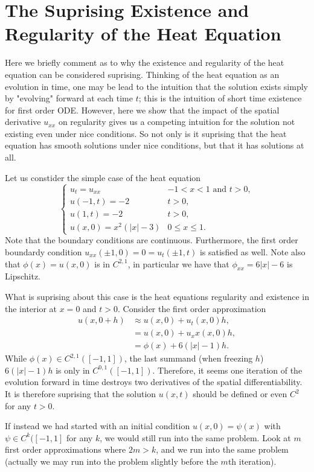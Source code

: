 \section{The Suprising Existence and Regularity of the Heat Equation}

Here we briefly comment as to why the existence and regularity of the heat equation can be considered suprising.
Thinking of the heat equation as an evolution in time, one may be lead to the intuition that the solution
exists simply by "evolving" forward at each time \(t\); this is the intuition of short time existence for 
first order ODE. However, here we show that the impact of the spatial derivative \(u_{xx}\) on regularity
gives us a competing intuition for the solution not existing even under nice conditions. So not only is it
suprising that the heat equation has smooth solutions under nice conditions, but that it has 
solutions at all.

Let us constider the simple case of the heat equation 
\begin{equation}
\begin{cases}
u_t = u_{xx} & -1 < x < 1 \text{ and } t > 0, \\
u(-1, t) = -2 & t > 0, \\
u(1, t) = -2 & t > 0, \\
u(x, 0) = x^2 (|x| - 3) & 0 \leq x \leq 1.
\end{cases}
\end{equation}
Note that the boundary conditions are continuous. Furthermore, the first order boundardy condition 
\(u_{xx}(\pm 1, 0) = 0 = u_t(\pm 1, t)\) is satisfied as well. Note also that \(\phi(x) = u(x, 0)\) is
in \(C^{2, 1}\), in particular we have that \(\phi_{xx} = 6|x| - 6\) is Lipschitz. 

What is suprising about this case is the heat equations regularity and existence in the interior at \(x = 0\)
and \(t > 0\). Consider the first order approximation 
\begin{align}
u(x, 0 + h) & \approx u(x, 0) + u_t(x, 0)h, \\
    & = u(x, 0) + u_xx(x, 0)h, \\
    & = \phi(x) + 6(|x| - 1)h.
\end{align}
While \(\phi(x) \in C^{2, 1}([-1, 1])\), the last summand (when freezing \(h\)) \(6(|x| - 1)h\) is only in 
\(C^{0, 1}([-1, 1])\). Therefore, it seems one iteration of the evolution forward in time destroys
two derivatives of the spatial differentiability. It is therefore suprising that the solution \(u(x, t)\) should
be defined or even \(C^2\) for any \(t > 0\). 

If instead we had started with an initial condition \(u(x, 0) = \psi(x)\) with \(\psi \in C^k([-1, 1]\) for any
\(k\), we would still run into the same problem. Look at \(m\) first order approximations where \(2m > k\), and
we run into the same problem (actually we may run into the problem slightly before the \(m\)th iteration).
